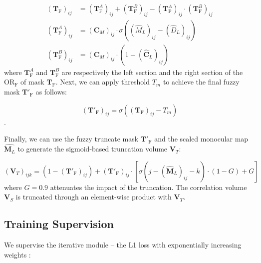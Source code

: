 \small\begin{equation}
    \begin{split}
        (\mathbf{T}_\text{F})_{ij} &= (\mathbf{T}^A_\text{F})_{ij} + (\mathbf{T}^B_\text{F})_{ij} - (\mathbf{T}^A_\text{F})_{ij} \cdot (\mathbf{T}^B_\text{F})_{ij}\\        
        (\mathbf{T}^A_\text{F})_{ij} &= (\mathbf{C}_M)_{ij} \cdot \sigma\left( (\hat{M}_L)_{ij} - (\hat{D}_L)_{ij} \right)\\
        (\mathbf{T}^B_\text{F})_{ij} &= (\mathbf{C}_M)_{ij} \cdot \left(1-(\hat{\mathbf{C}}_L)_{ij}\right)
    \end{split}
    \label{eq:truncate_mask_fuzzy}
\end{equation}\normalsize
where $\mathbf{T}^A_\text{F}$ and $\mathbf{T}^B_\text{F}$ are respectively the left section and the right section of the $\text{OR}_\text{F}$ of mask $\textbf{T}_\text{F}$.
Next, we can apply threshold $T_m$ to achieve the final fuzzy mask $\mathbf{T}'_\text{F}$ as follows:

\small\begin{equation}
    (\mathbf{T}'_\text{F})_{ij}=\sigma\left((\mathbf{T}_\text{F})_{ij}-T_m\right)
    \label{eq:truncate_mask_fuzzy_thresholded}
\end{equation}\normalsize.

Finally, we can use the fuzzy truncate mask $\mathbf{T}'_\text{F}$ and the scaled monocular map $\hat{\mathbf{M}_L}$ to generate the sigmoid-based truncation volume $\mathbf{V}_T$:

\small\begin{equation}
    (\mathbf{V}_T)_{ijk} = \left(1-(\mathbf{T}'_\text{F})_{ij}\right) + (\mathbf{T}'_\text{F})_{ij} \cdot \left[ \sigma\left(j - (\hat{\mathbf{M}}_L)_{ij} - k\right) \cdot (1-G) + G \right]
    \label{eq:truncate_vol}
\end{equation}\normalsize
where $G=0.9$ attenuates the impact of the truncation. 
The correlation volume $\mathbf{V}_S$ is truncated through an element-wise product with $\mathbf{V}_T$.

\subsection{Training Supervision}
\label{subsec:training}

We supervise the iterative module  -- the L1 loss with exponentially increasing weights \cite{lipson2021raft}:

